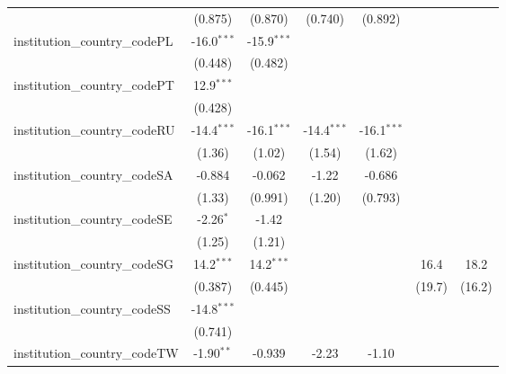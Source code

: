 \begin{tabular}{lcccccc}
                                         & (0.875)       & (0.870)       & (0.740)       & (0.892)       &               &   \\   
   institution\_country\_codePL          & -16.0$^{***}$ & -15.9$^{***}$ &               &               &               &   \\   
                                         & (0.448)       & (0.482)       &               &               &               &   \\   
   institution\_country\_codePT          & 12.9$^{***}$  &               &               &               &               &   \\   
                                         & (0.428)       &               &               &               &               &   \\   
   institution\_country\_codeRU          & -14.4$^{***}$ & -16.1$^{***}$ & -14.4$^{***}$ & -16.1$^{***}$ &               &   \\   
                                         & (1.36)        & (1.02)        & (1.54)        & (1.62)        &               &   \\   
   institution\_country\_codeSA          & -0.884        & -0.062        & -1.22         & -0.686        &               &   \\   
                                         & (1.33)        & (0.991)       & (1.20)        & (0.793)       &               &   \\   
   institution\_country\_codeSE          & -2.26$^{*}$   & -1.42         &               &               &               &   \\   
                                         & (1.25)        & (1.21)        &               &               &               &   \\   
   institution\_country\_codeSG          & 14.2$^{***}$  & 14.2$^{***}$  &               &               & 16.4          & 18.2\\   
                                         & (0.387)       & (0.445)       &               &               & (19.7)        & (16.2)\\   
   institution\_country\_codeSS          & -14.8$^{***}$ &               &               &               &               &   \\   
                                         & (0.741)       &               &               &               &               &   \\   
   institution\_country\_codeTW          & -1.90$^{**}$  & -0.939        & -2.23         & -1.10         &               &   \\   

\end{tabular}
